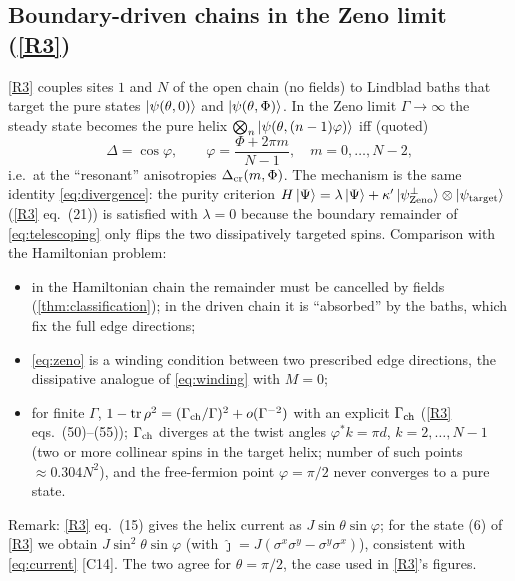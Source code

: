 \documentclass[11pt,a4paper]{article}
\theoremstyle{definition}
\newcommand{\ver}[1]{\textsf{[#1]}}   %
\begin{document}
\subsection{Boundary-driven chains in the Zeno limit (\ref{R3})}
\ref{R3} couples sites $1$ and $N$ of the open chain (no fields) to Lindblad baths that target the pure states $\ket{\psi(\theta,0)}$ and $\ket{\psi(\theta,\Phi)}$. In the Zeno limit $\Gamma\to\infty$ the steady state becomes the pure helix $\bigotimes_n\ket{\psi(\theta,(n-1)\varphi)}$ iff (quoted)
\begin{equation}\label{eq:zeno}
\Delta=\cos\varphi,\qquad \varphi=\frac{\Phi+2\pi m}{N-1},\quad m=0,\dots,N-2,
\end{equation}
i.e.\ at the ``resonant'' anisotropies $\Delta_{\rm cr}(m,\Phi)$. The mechanism is the same identity \eqref{eq:divergence}: the purity criterion $H\ket\Psi=\lambda\ket\Psi+\kappa'\ket{\psi^\perp_{\rm Zeno}}\otimes\ket{\psi_{\rm target}}$ (\ref{R3} eq.~(21)) is satisfied with $\lambda=0$ because the boundary remainder of \eqref{eq:telescoping} only flips the two dissipatively targeted spins. Comparison with the Hamiltonian problem:
\begin{itemize}
\item in the Hamiltonian chain the remainder must be cancelled by fields (\cref{thm:classification}); in the driven chain it is ``absorbed'' by the baths, which fix the full edge directions;
\item \eqref{eq:zeno} is a winding condition between two prescribed edge directions, the dissipative analogue of \eqref{eq:winding} with $M=0$;
\item for finite $\Gamma$, $1-\operatorname{tr}\rho^2=(\Gamma_{\rm ch}/\Gamma)^2+o(\Gamma^{-2})$ with an explicit $\Gamma_{\rm ch}$ (\ref{R3} eqs.~(50)--(55)); $\Gamma_{\rm ch}$ diverges at the twist angles $\varphi^*k=\pi d$, $k=2,\dots,N-1$ (two or more collinear spins in the target helix; number of such points $\approx0.304N^2$), and the free-fermion point $\varphi=\pi/2$ never converges to a pure state.
\end{itemize}
Remark: \ref{R3} eq.~(15) gives the helix current as $J\sin\theta\sin\varphi$; for the state (6) of \ref{R3} we obtain $J\sin^2\theta\sin\varphi$ (with $\hat\jmath=J(\sigma^x\sigma^y-\sigma^y\sigma^x)$), consistent with \eqref{eq:current} \ver{C14}. The two agree for $\theta=\pi/2$, the case used in \ref{R3}'s figures.
\end{document}
